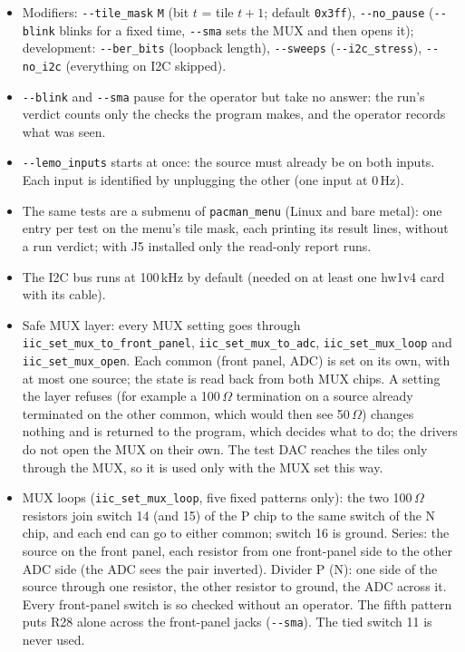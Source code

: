 \documentclass[11pt]{article}
\newcommand{\opt}[1]{\texttt{-{}-#1}}
\begin{document}
\begin{itemize}
\item Modifiers: \opt{tile\_mask} \texttt{M} (bit $t$ = tile $t+1$; default \texttt{0x3ff}), \opt{no\_pause}
  (\opt{blink} blinks for a fixed time, \opt{sma} sets the MUX and then opens it); development: \opt{ber\_bits}
  (loopback length), \opt{sweeps} (\opt{i2c\_stress}), \opt{no\_i2c} (everything on I2C skipped).
\item \opt{blink} and \opt{sma} pause for the operator but take no answer: the run's verdict counts only the
  checks the program makes, and the operator records what was seen.
\item \opt{lemo\_inputs} starts at once: the source must already be on both inputs.  Each input is identified by
  unplugging the other (one input at 0\,Hz).
\item The same tests are a submenu of \texttt{pacman\_menu} (Linux and bare metal):  one entry per test on the
  menu's tile mask, each printing its result lines, without a run verdict; with J5 installed only the read-only
  report runs.
\item The I2C bus runs at 100\,kHz by default (needed on at least one hw1v4 card with its cable).
\item Safe MUX layer: every MUX setting goes through \texttt{iic\_set\_mux\_to\_front\_panel},
  \texttt{iic\_set\_mux\_to\_adc}, \texttt{iic\_set\_mux\_loop} and \texttt{iic\_set\_mux\_open}.  Each common
  (front panel, ADC) is set on its own, with at most one source; the state is read back from both MUX chips.  A
  setting the layer refuses (for example a 100\,$\Omega$ termination on a source already terminated on the other
  common, which would then see 50\,$\Omega$) changes nothing and is returned to the program, which decides what to
  do; the drivers do not open the MUX on their own.  The test DAC reaches the tiles only through the MUX, so it is used only with the
  MUX set this way.
\item MUX loops (\texttt{iic\_set\_mux\_loop}, five fixed patterns only):  the two 100\,$\Omega$ resistors join switch
  14 (and 15) of the P chip to the same switch of the N chip, and each end can go to either common; switch 16 is
  ground.  Series: the source on the front panel, each resistor from one front-panel side to the other ADC side (the
  ADC sees the pair inverted).  Divider P (N): one side of the source through one resistor, the other resistor to
  ground, the ADC across it.  Every front-panel switch is so checked without an operator.  The fifth pattern puts
  R28 alone across the front-panel jacks (\opt{sma}).  The tied switch 11 is never used.
\end{itemize}
\end{document}
